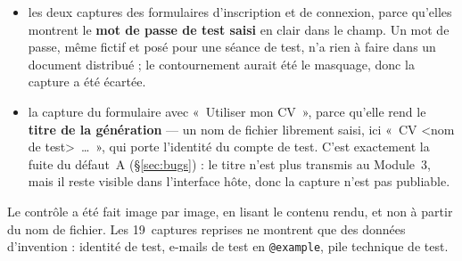 \begin{itemize}[leftmargin=*,itemsep=2pt]
  \item les deux captures des formulaires d'inscription et de connexion, parce
        qu'elles montrent le \textbf{mot de passe de test saisi} en clair dans le
        champ. Un mot de passe, même fictif et posé pour une séance de test,
        n'a rien à faire dans un document distribué ; le contournement aurait été
        le masquage, donc la capture a été écartée.
  \item la capture du formulaire avec «~Utiliser mon CV~», parce qu'elle rend le
        \textbf{titre de la génération} --- un nom de fichier librement saisi,
        ici «~CV \textless{}nom de test\textgreater{}~\dots~», qui porte
        l'identité du compte de test. C'est exactement la fuite du défaut~A
        (§\ref{sec:bugs}) : le titre n'est plus transmis au Module~3, mais il
        reste visible dans l'interface hôte, donc la capture n'est pas publiable.
\end{itemize}

Le contrôle a été fait image par image, en lisant le contenu rendu, et non à
partir du nom de fichier. Les 19~captures reprises ne montrent que des données
d'invention : identité de test, e-mails de test en \texttt{@example}, pile
technique de test.
